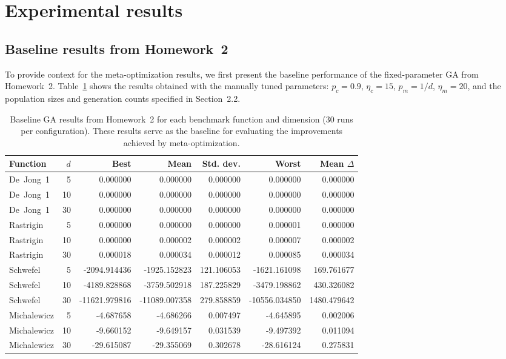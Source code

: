 \documentclass[11pt]{article}
\begin{document}
\section{Experimental results}

\subsection{Baseline results from Homework~2}
\label{sec:baseline}

To provide context for the meta-optimization results, we first present
the baseline performance of the fixed-parameter GA from Homework~2.
Table~\ref{tab:baseline} shows the results obtained with the manually
tuned parameters: $p_c = 0.9$, $\eta_c = 15$, $p_m = 1/d$, $\eta_m = 20$,
and the population sizes and generation counts specified in Section~2.2.

\begin{table}[t]
  \centering
  \small
  \caption{Baseline GA results from Homework~2 for each benchmark function
  and dimension (30 runs per configuration). These results serve as the
  baseline for evaluating the improvements achieved by meta-optimization.}
  \label{tab:baseline}
  \begin{tabular}{lrrrrrr}
    \toprule
    Function & $d$ & Best & Mean & Std. dev. & Worst & Mean $\Delta$ \\
    \midrule
    De~Jong~1 & 5  & 0.000000 & 0.000000 & 0.000000 & 0.000000 & 0.000000 \\ 
    De~Jong~1 & 10 & 0.000000 & 0.000000 & 0.000000 & 0.000000 & 0.000000 \\ 
    De~Jong~1 & 30 & 0.000000 & 0.000000 & 0.000000 & 0.000000 & 0.000000 \\ 
    \midrule
    Rastrigin & 5  & 0.000000 & 0.000000 & 0.000000 & 0.000001 & 0.000000 \\ 
    Rastrigin & 10 & 0.000000 & 0.000002 & 0.000002 & 0.000007 & 0.000002 \\ 
    Rastrigin & 30 & 0.000018 & 0.000034 & 0.000012 & 0.000085 & 0.000034 \\ 
    \midrule
    Schwefel & 5  & -2094.914436 & -1925.152823 & 121.106053 & -1621.161098 & 169.761677 \\ 
    Schwefel & 10 & -4189.828868 & -3759.502918 & 187.225829 & -3479.198862 & 430.326082 \\ 
    Schwefel & 30 & -11621.979816 & -11089.007358 & 279.858859 & -10556.034850 & 1480.479642 \\ 
    \midrule
    Michalewicz & 5  & -4.687658 & -4.686266 & 0.007497 & -4.645895 & 0.002006 \\ 
    Michalewicz & 10 & -9.660152 & -9.649157 & 0.031539 & -9.497392 & 0.011094 \\ 
    Michalewicz & 30 & -29.615087 & -29.355069 & 0.302678 & -28.616124 & 0.275831 \\ 
    \bottomrule
  \end{tabular}
\end{table}
\end{document}
